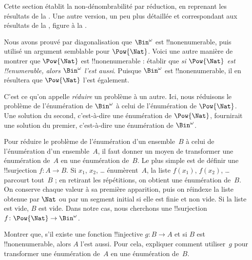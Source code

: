 \documentclass[../../../include/open-logic-section]{subfiles}
\begin{document}


\begin{editorial}
  Cette section établit la non-dénombrabilité par réduction, en
  reprenant les résultats de la . Une autre
  version, un peu plus détaillée et correspondant aux résultats
  de la , figure à la .
\end{editorial}

Nous avons prouvé par diagonalisation que $\Bin^\omega$ est
!!{nonenumerable}, puis utilisé un argument semblable pour
$\Pow{\Nat}$. Voici une autre manière de montrer que
$\Pow{\Nat}$ est !!{nonenumerable} : établir que \emph{si
$\Pow{\Nat}$ est !!{enumerable}, alors $\Bin^\omega$ l'est
aussi}. Puisque $\Bin^\omega$ est !!{nonenumerable}, il en
résultera que $\Pow{\Nat}$ l'est également.

C'est ce qu'on appelle \emph{réduire} un problème à un autre.
Ici, nous réduisons le problème de l'énumération de $\Bin^\omega$
à celui de l'énumération de $\Pow{\Nat}$. Une solution du second,
c'est-à-dire une énumération de $\Pow{\Nat}$, fournirait une
solution du premier, c'est-à-dire une énumération de $\Bin^\omega$.

Pour réduire le problème de l'énumération d'un ensemble~$B$ à
celui de l'énumération d'un ensemble~$A$, il faut donner un moyen
de transformer une énumération de~$A$ en une énumération de~$B$.
Le plus simple est de définir une !!{surjection} $f\colon A \to B$.
Si $x_1$, $x_2$, \dots{} énumèrent~$A$, la liste $f(x_1)$,
$f(x_2)$, \dots{} parcourt tout~$B$ ; en retirant les répétitions,
on obtient une énumération de~$B$. On conserve chaque valeur
à sa première apparition, puis on réindexe la liste obtenue par
$\Nat$ ou par un segment initial si elle est finie et non vide.
Si la liste est vide, $B$ est vide.
%
%
Dans notre cas, nous cherchons une !!{surjection}
$f\colon \Pow{\Nat} \to \Bin^\omega$.

\begin{prob}
Montrer que, s'il existe une fonction !!{injective} $g\colon B \to A$
et si $B$ est !!{nonenumerable}, alors $A$ l'est aussi. Pour cela,
expliquer comment utiliser~$g$ pour transformer une énumération
de~$A$ en une énumération de~$B$.
\end{prob}
\end{document}
